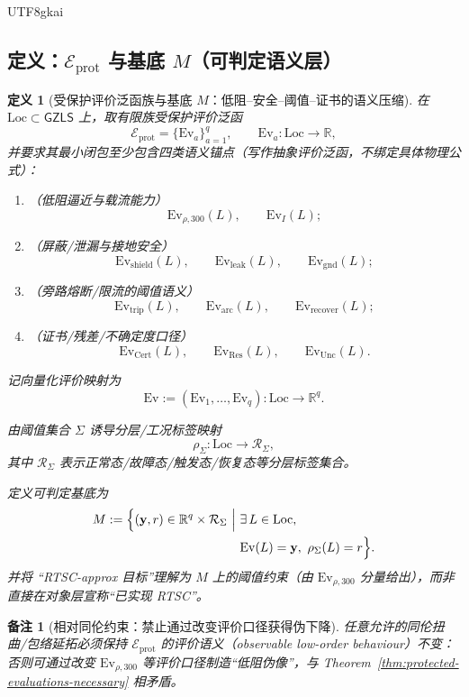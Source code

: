 \documentclass[12pt]{article}
\newtheorem{definition}{定义}[section]
\newtheorem{remark}{备注}[section]
\newcommand{\GZLS}{\ensuremath{\mathsf{GZLS}}}
\begin{document}
\begin{CJK*}{UTF8}{gkai}
\subsection{定义：$\mathcal{E}_{\mathrm{prot}}$ 与基底 $M$（可判定语义层）}

\begin{definition}[受保护评价泛函族与基底 $M$：低阻--安全--阈值--证书的语义压缩]
\label{def:rtsc-approx-eprot-base}
在 $\mathrm{Loc}\subset\GZLS$ 上，取有限族受保护评价泛函
\[
\mathcal{E}_{\mathrm{prot}}=\{\mathrm{Ev}_a\}_{a=1}^{q},
\qquad
\mathrm{Ev}_a:\mathrm{Loc}\to\mathbb{R},
\]
并要求其最小闭包至少包含四类语义锚点（写作抽象评价泛函，不绑定具体物理公式）：
\begin{enumerate}
  \item（低阻逼近与载流能力）
  \[
  \mathrm{Ev}_{\rho,300}(L),\qquad \mathrm{Ev}_{I}(L);
  \]
  \item（屏蔽/泄漏与接地安全）
  \[
  \mathrm{Ev}_{\mathrm{shield}}(L),\qquad
  \mathrm{Ev}_{\mathrm{leak}}(L),\qquad
  \mathrm{Ev}_{\mathrm{gnd}}(L);
  \]
  \item（旁路熔断/限流的阈值语义）
  \[
  \mathrm{Ev}_{\mathrm{trip}}(L),\qquad
  \mathrm{Ev}_{\mathrm{arc}}(L),\qquad
  \mathrm{Ev}_{\mathrm{recover}}(L);
  \]
  \item（证书/残差/不确定度口径）
  \[
  \mathrm{Ev}_{\mathrm{Cert}}(L),\qquad
  \mathrm{Ev}_{\mathrm{Res}}(L),\qquad
  \mathrm{Ev}_{\mathrm{Unc}}(L).
  \]
\end{enumerate}
记向量化评价映射为
\[
\mathrm{Ev}:=(\mathrm{Ev}_1,\dots,\mathrm{Ev}_q):\mathrm{Loc}\to\mathbb{R}^q.
\]

由阈值集合 $\Sigma$ 诱导分层/工况标签映射
\[
\rho_{\Sigma}:\mathrm{Loc}\to \mathcal{R}_{\Sigma},
\]
其中 $\mathcal{R}_{\Sigma}$ 表示正常态/故障态/触发态/恢复态等分层标签集合。

定义可判定基底为
\[
\begin{aligned}
M
:=
\Bigl\{
(\mathbf{y},r)\in \mathbb{R}^q\times \mathcal{R}_{\Sigma}\ \Big|\
&\exists\,L\in \mathrm{Loc},\\
&\mathrm{Ev}(L)=\mathbf{y},\ \rho_{\Sigma}(L)=r
\Bigr\}.
\end{aligned}
\]
并将 “\textsf{RTSC-approx} 目标”理解为 $M$ 上的阈值约束（由 $\mathrm{Ev}_{\rho,300}$ 分量给出），而非直接在对象层宣称“已实现 RTSC”。
\end{definition}

\begin{remark}[相对同伦约束：禁止通过改变评价口径获得伪下降]
任意允许的同伦扭曲/包络延拓必须保持 $\mathcal{E}_{\mathrm{prot}}$ 的评价语义（observable low-order behaviour）不变：
否则可通过改变 $\mathrm{Ev}_{\rho,300}$ 等评价口径制造“低阻伪像”，与 Theorem~\ref{thm:protected-evaluations-necessary} 相矛盾。
\end{remark}


\end{CJK*}
\end{document}
